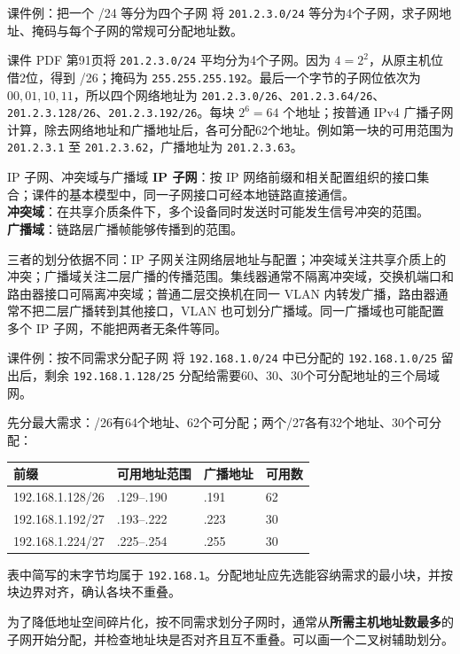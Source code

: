 \begin{example}{课件例：把一个 /24 等分为四个子网}
将 \texttt{201.2.3.0/24} 等分为4个子网，求子网地址、掩码与每个子网的常规可分配地址数。
\end{example}
\begin{solution}
\begin{sloppypar}
课件 PDF 第91页将 \texttt{201.2.3.0/24} 平均分为4个子网。因为 $4=2^2$，从原主机位借2位，得到 /26；掩码为 \texttt{255.255.255.192}。最后一个字节的子网位依次为 $00,01,10,11$，所以四个网络地址为 \texttt{201.2.3.0/26}、\texttt{201.2.3.64/26}、\texttt{201.2.3.128/26}、\texttt{201.2.3.192/26}。每块 $2^6=64$ 个地址；按普通 IPv4 广播子网计算，除去网络地址和广播地址后，各可分配62个地址。例如第一块的可用范围为 \texttt{201.2.3.1} 至 \texttt{201.2.3.62}，广播地址为 \texttt{201.2.3.63}。
\end{sloppypar}
\end{solution}

\begin{definition}{IP 子网、冲突域与广播域}
\textbf{IP 子网}：按 IP 网络前缀和相关配置组织的接口集合；课件的基本模型中，同一子网接口可经本地链路直接通信。\\
\textbf{冲突域}：在共享介质条件下，多个设备同时发送时可能发生信号冲突的范围。\\
\textbf{广播域}：链路层广播帧能够传播到的范围。
\end{definition}
\begin{remark}
三者的划分依据不同：IP 子网关注网络层地址与配置；冲突域关注共享介质上的冲突；广播域关注二层广播的传播范围。集线器通常不隔离冲突域，交换机端口和路由器接口可隔离冲突域；普通二层交换机在同一 VLAN 内转发广播，路由器通常不把二层广播转到其他接口，VLAN 也可划分广播域。同一广播域也可能配置多个 IP 子网，不能把两者无条件等同。
\end{remark}
\annotationarea[4]

\begin{example}{课件例：按不同需求分配子网}
将 \texttt{192.168.1.0/24} 中已分配的 \texttt{192.168.1.0/25} 留出后，剩余 \texttt{192.168.1.128/25} 分配给需要60、30、30个可分配地址的三个局域网。
\end{example}
\begin{solution}
先分最大需求：/26有64个地址、62个可分配；两个/27各有32个地址、30个可分配：
\begin{center}\begin{tabular}{llll}\toprule 前缀 & 可用地址范围 & 广播地址 & 可用数\\\midrule
192.168.1.128/26 & .129--.190 & .191 & 62\\
192.168.1.192/27 & .193--.222 & .223 & 30\\
192.168.1.224/27 & .225--.254 & .255 & 30\\\bottomrule\end{tabular}\end{center}
表中简写的末字节均属于 \texttt{192.168.1}。分配地址应先选能容纳需求的最小块，并按块边界对齐，确认各块不重叠。
\end{solution}
\begin{remark}
为了降低地址空间碎片化，按不同需求划分子网时，通常从\textbf{所需主机地址数最多}的子网开始分配，并检查地址块是否对齐且互不重叠。可以画一个二叉树辅助划分。
\end{remark}

